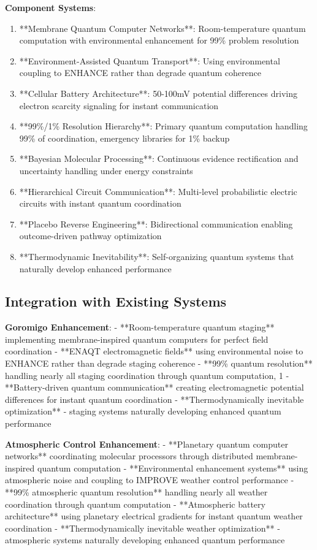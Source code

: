 \documentclass[12pt,a4paper]{article}
\begin{document}
\textbf{Component Systems}:
\begin{enumerate}
\item **Membrane Quantum Computer Networks**: Room-temperature quantum computation with environmental enhancement for 99\% problem resolution
\item **Environment-Assisted Quantum Transport**: Using environmental coupling to ENHANCE rather than degrade quantum coherence
\item **Cellular Battery Architecture**: 50-100mV potential differences driving electron scarcity signaling for instant communication
\item **99\%/1\% Resolution Hierarchy**: Primary quantum computation handling 99\% of coordination, emergency libraries for 1\% backup
\item **Bayesian Molecular Processing**: Continuous evidence rectification and uncertainty handling under energy constraints
\item **Hierarchical Circuit Communication**: Multi-level probabilistic electric circuits with instant quantum coordination
\item **Placebo Reverse Engineering**: Bidirectional communication enabling outcome-driven pathway optimization
\item **Thermodynamic Inevitability**: Self-organizing quantum systems that naturally develop enhanced performance
\end{enumerate}

\subsection{Integration with Existing Systems}

\textbf{Goromigo Enhancement}:
- **Room-temperature quantum staging** implementing membrane-inspired quantum computers for perfect field coordination
- **ENAQT electromagnetic fields** using environmental noise to ENHANCE rather than degrade staging coherence
- **99\% quantum resolution** handling nearly all staging coordination through quantum computation, 1%
- **Battery-driven quantum communication** creating electromagnetic potential differences for instant quantum coordination
- **Thermodynamically inevitable optimization** - staging systems naturally developing enhanced quantum performance

\textbf{Atmospheric Control Enhancement}:
- **Planetary quantum computer networks** coordinating molecular processors through distributed membrane-inspired quantum computation
- **Environmental enhancement systems** using atmospheric noise and coupling to IMPROVE weather control performance
- **99\% atmospheric quantum resolution** handling nearly all weather coordination through quantum computation
- **Atmospheric battery architecture** using planetary electrical gradients for instant quantum weather coordination
- **Thermodynamically inevitable weather optimization** - atmospheric systems naturally developing enhanced quantum performance
\end{document}
